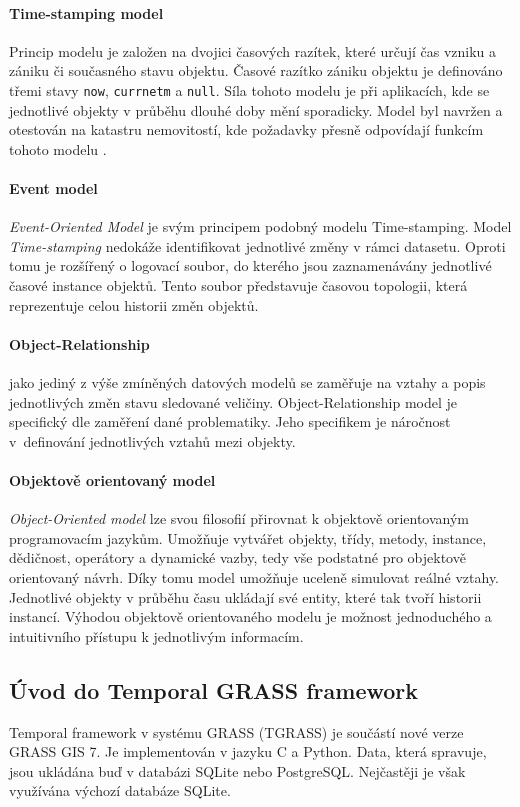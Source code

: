 \documentclass[a4paper,12pt,oneside]{report}
\begin{document}
\paragraph*{Time-stamping model} 
Princip modelu je založen na dvojici časových razítek, které
určují čas vzniku a zániku či současného stavu
objektu. Časové razítko zániku objektu je definováno třemi stavy
\texttt{now}, \texttt{currnetm} a \texttt{null}.  Síla tohoto modelu
je při aplikacích, kde se jednotlivé objekty v průběhu dlouhé doby
mění sporadicky. Model byl navržen a otestován na katastru
nemovitostí, kde požadavky přesně odpovídají funkcím tohoto
modelu \cite{hunter}.

\paragraph*{Event model}
\textit{Event-Oriented Model} je svým principem podobný modelu Time-stamping. Model \textit{Time-stamping }nedokáže identifikovat jednotlivé změny v
rámci datasetu. Oproti tomu je  rozšířený o logovací
soubor, do kterého jsou zaznamenávány jednotlivé časové instance
objektů. Tento soubor představuje časovou topologii, která
reprezentuje celou historii změn objektů.

\paragraph*{Object-Relationship}
jako jediný z výše zmíněných datových modelů se zaměřuje na vztahy a popis
jednotlivých změn stavu sledované veličiny. Object-Relationship model je   specifický dle zaměření
dané problematiky. Jeho specifikem  je  náročnost v~definování
jednotlivých vztahů mezi objekty.

\paragraph*{Objektově orientovaný model}
\textit{Object-Oriented model}  lze svou filosofií přirovnat k objektově 
orientovaným programovacím jazykům. Umožňuje vytvářet
objekty, třídy, metody, instance, dědičnost, operátory a dynamické
vazby, tedy vše podstatné pro objektově orientovaný návrh. Díky tomu model umožňuje  uceleně simulovat reálné vztahy.  Jednotlivé objekty
v průběhu času ukládají své entity, které tak tvoří historii
instancí. Výhodou objektově orientovaného modelu je možnost jednoduchého a
intuitivního přístupu k jednotlivým informacím.


\subsection{Úvod do Temporal GRASS framework}
Temporal framework v systému GRASS (TGRASS) je součástí nové verze GRASS GIS 7. Je
implementován v jazyku C a Python. Data, která spravuje, jsou ukládána buď
v databázi SQLite nebo PostgreSQL. Nejčastěji je však
využívána výchozí databáze SQLite.
\end{document}
